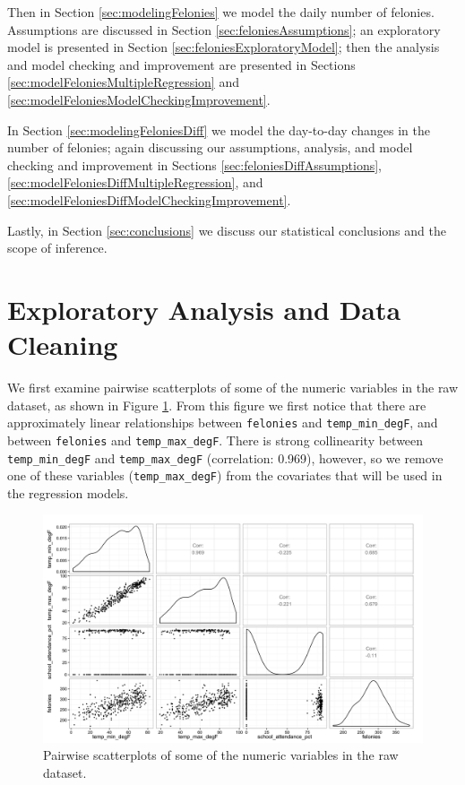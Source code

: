 \documentclass[11pt,notitlepage]{article}
\begin{document}
Then in Section \ref{sec:modelingFelonies} we model the daily number of felonies. Assumptions are discussed in Section \ref{sec:feloniesAssumptions}; an exploratory model is presented in Section \ref{sec:feloniesExploratoryModel}; then the analysis and model checking and improvement are presented in Sections \ref{sec:modelFeloniesMultipleRegression} and \ref{sec:modelFeloniesModelCheckingImprovement}.

In Section \ref{sec:modelingFeloniesDiff} we model the day-to-day changes in the number of felonies; again discussing our assumptions, analysis, and model checking and improvement in Sections \ref{sec:feloniesDiffAssumptions}, \ref{sec:modelFeloniesDiffMultipleRegression}, and \ref{sec:modelFeloniesDiffModelCheckingImprovement}.

Lastly, in Section \ref{sec:conclusions} we discuss our statistical conclusions and the scope of inference.





\section{Exploratory Analysis and Data Cleaning}
\label{sec:eda}

We first examine pairwise scatterplots of some of the numeric variables in the raw dataset, as shown in Figure \ref{fig:pairsNumericExclAcc}. From this figure we first notice that there are approximately linear relationships between \texttt{felonies} and \texttt{temp_min_degF}, and between \texttt{felonies} and \texttt{temp_max_degF}. There is strong collinearity between \texttt{temp_min_degF} and \texttt{temp_max_degF} (correlation: 0.969), however, so we remove one of these variables (\texttt{temp_max_degF}) from the covariates that will be used in the regression models.

\begin{figure}[!h]
  \vspace*{-3mm}
	\centering
	\captionsetup{width=0.9\textwidth}
	\includegraphics[width=6in]{figures/pairsNumericExclAcc.png}
	\vspace*{-3mm}
	\caption{Pairwise scatterplots of some of the numeric variables in the raw dataset.}
	\label{fig:pairsNumericExclAcc}
	\vspace*{-3mm}
\end{figure}
\end{document}
